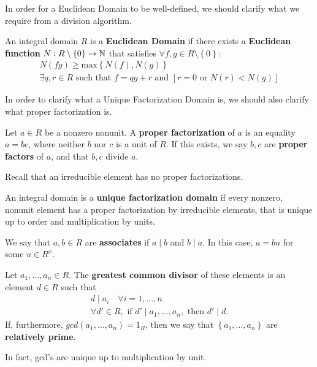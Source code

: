 \documentclass{memoir}
\begin{document}

In order for a Euclidean Domain to be well-defined, we should clarify what we require from a division algorithm.

\begin{defn}
	An integral domain \(R\) is a \textbf{Euclidean Domain} if there exists a \textbf{Euclidean function} \(N:R\setminus\left\{ 0 \right\} \to \mathbb{N}\) that satisfies \(\forall f,g \in R\setminus \left\{ 0 \right\} \):
	\begin{align*}
		N(fg) \geq \textrm{max}\left\{ N(f),N(g) \right\}\\
		\exists q,r \in R \text{ such that }f = qg + r \text{ and }\left[ r = 0 \text{ or }N(r)<N(g) \right] 
	\end{align*}
\end{defn}
In order to clarify what a Unique Factorization Domain is, we should also clarify what proper factorization is.

\begin{defn}
	Let \(a \in R\) be a nonzero nonunit. A \textbf{proper factorization} of \(a\) is an equality \(a=bc\), where neither \(b\) nor \(c\) is a unit of \(R\). If this exists, we say \(b,c\) are \textbf{proper factors} of \(a\), and that \(b,c\) divide \(a\).
\end{defn}
Recall that an irreducible element has no proper factorizations.

\begin{defn}
	An integral domain is a \textbf{unique factorization domain} if every nonzero, nonunit element has a proper factorization by irreducible elements, that is unique up to order and multiplication by units.
\end{defn}

\begin{defn}[Associates]
	We say that \(a,b \in R\) are \textbf{associates} if \(a \mid b\) and \(b\mid a\). In this case, \(a = bu\) for some \( u \in R^{x}\).
\end{defn}
\vspace{5mm} %
\begin{defn}
	Let \(a_1,\ldots,a_n \in R\). The \textbf{greatest common divisor} of these elements is an element \(d \in R\) such that
	\begin{align*}
		d\mid a_i \quad \forall i = 1,\ldots,n\\
		\forall d' \in R, \text{ if }d' \mid a_1,\ldots,a_n, \text{ then }d' \mid d.
	\end{align*}
	If, furthermore, \(gcd(a_1,\ldots,a_n) = 1_R\), then we say that \(\left\{a_1,\ldots,a_n \right\} \) are \textbf{relatively prime}.
\end{defn}
In fact, gcd's are unique up to multiplication by unit.\\
\end{document}
